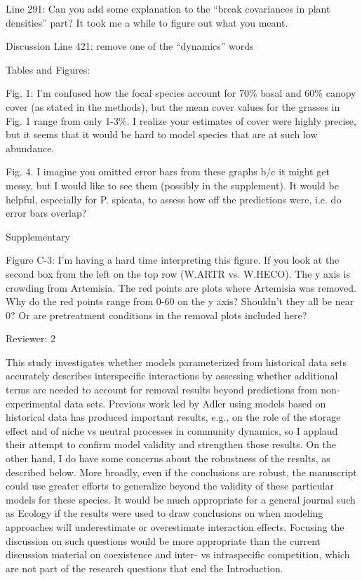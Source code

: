 \documentclass[12pt]{article}
\begin{document}
{Line 291: Can you add some explanation to the “break covariances in plant densities” part? It took me a while to figure out what you meant. 

Discussion
Line 421: remove one of the “dynamics” words 

Tables and Figures:

Fig. 1: I’m confused how the focal species account for 70\% basal and 60\% canopy cover (as stated in the methods), but the mean cover values for the grasses in Fig. 1 range from only 1-3\%. I realize your estimates of cover were highly precise, but it seems that it would be hard to model species that are at such low abundance.

Fig. 4. I imagine you omitted error bars from these graphs b/c it might get messy, but I would like to see them (possibly in the supplement). It would be helpful, especially for P. spicata, to assess how off the predictions were, i.e. do error bars overlap?

Supplementary

Figure C-3: I’m having a hard time interpreting this figure. If you look at the second box from the left on the top row (W.ARTR vs. W.HECO). The y axis is crowding from Artemisia. The red points are plots where Artemisia was removed. Why do the red points range from 0-60 on the y axis? Shouldn't they all be near 0? Or are pretreatment conditions in the removal plots included here? 


Reviewer: 2

This study investigates whether models parameterized from historical data sets accurately describes
interspecific interactions by assessing whether additional terms are needed to account for removal
results beyond predictions from non-experimental data sets. Previous work led by Adler using models
based on historical data has produced important results, e.g., on the role of the storage effect and of
niche vs neutral processes in community dynamics, so I applaud their attempt to confirm model validity
and strengthen those results. On the other hand, I do have some concerns about the robustness of the
results, as described below. More broadly, even if the conclusions are robust, the manuscript could use
greater efforts to generalize beyond the validity of these particular models for these species. It would
be much appropriate for a general journal such as Ecology if the results were used to draw conclusions
on when modeling approaches will underestimate or overestimate interaction effects. Focusing the
discussion on such questions would be more appropriate than the current discussion material on
coexistence and inter- vs intraspecific competition, which are not part of the research questions that
end the Introduction.

}
\end{document}
